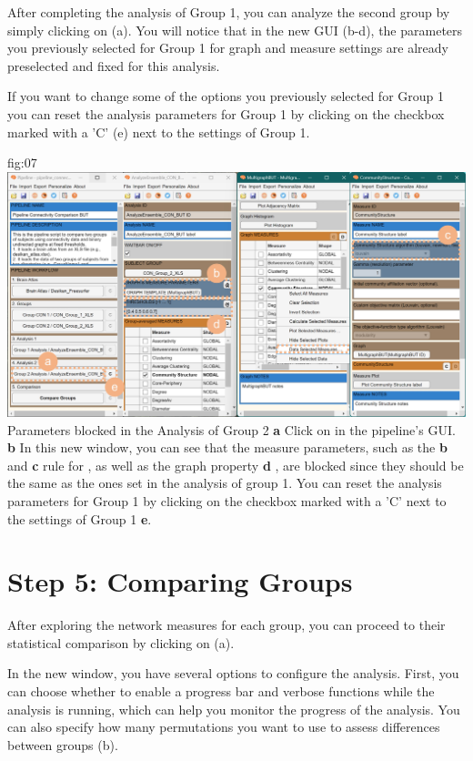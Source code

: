 \documentclass[justified]{tufte-handout}
\begin{document}
After completing the analysis of Group 1, you can analyze the second group by simply clicking on  (a). You will notice that in the new GUI (b-d), the parameters you previously selected for Group 1 for graph and measure settings are already preselected and fixed for this analysis. 

If you want to change some of the options you previously selected for Group 1 you can reset the analysis parameters for Group 1 by clicking on the checkbox marked with a 'C' (e) next to the settings of Group 1.


	{fig:07}
	{
	\includegraphics{fig07.jpg}
	}
	{Parameters blocked in the Analysis of Group 2}
	{
	{\bf a} Click on  in the pipeline's GUI.
	{\bf b} In this new window, you can see that the measure parameters, such as the {\bf b}  and {\bf c} rule for , as well as the graph property {\bf d} , are blocked since they should be the same as the ones set in the analysis of group 1. You can reset the analysis parameters for Group 1 by clicking on the checkbox marked with a 'C' next to the settings of Group 1 {\bf e}.
	}
 
\section{Step 5: Comparing Groups}

After exploring the network measures for each group, you can proceed to their statistical comparison by clicking on  (a).

In the new window, you have several options to configure the analysis. First, you can choose whether to enable a progress bar and verbose functions while the analysis is running, which can help you monitor the progress of the analysis. You can also specify how many permutations you want to use to assess differences between groups (b).
\end{document}
